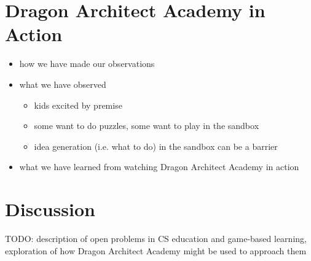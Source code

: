 \documentclass{sig-alternate}
\newcommand{\TODO}[1]{{\color{red} TODO: #1}}
\newcommand{\gametitle}{{\color{RoyalPurple} Dragon Architect Academy}}
\begin{document}
\section{\gametitle{} in Action}
\begin{itemize}
\item how we have made our observations
\item what we have observed
\begin{itemize}
\item kids excited by premise
\item some want to do puzzles, some want to play in the sandbox
\item idea generation (i.e. what to do) in the sandbox can be a barrier
\end{itemize}

\item what we have learned from watching \gametitle{} in action
\end{itemize}


\section{Discussion}
\TODO{description of open problems in CS education and game-based learning, exploration of how \gametitle{} might be used to approach them}



 
\end{document}
